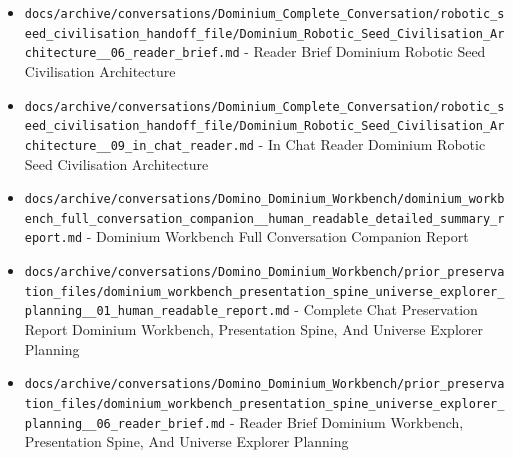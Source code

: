 \documentclass[10.5pt,a4paper,openany]{book}
\begin{document}
\begin{itemize}
\item \texttt{docs/\allowbreak{}archive/\allowbreak{}conversations/\allowbreak{}Dominium\_\allowbreak{}Complete\_\allowbreak{}Conversation/\allowbreak{}robotic\_\allowbreak{}seed\_\allowbreak{}civilisation\_\allowbreak{}handoff\_\allowbreak{}file/\allowbreak{}Dominium\_\allowbreak{}Robotic\_\allowbreak{}Seed\_\allowbreak{}Civilisation\_\allowbreak{}Architecture\_\allowbreak{}\_\allowbreak{}06\_\allowbreak{}reader\_\allowbreak{}brief.\allowbreak{}md} -\allowbreak{} Reader Brief Dominium Robotic Seed Civilisation Architecture
\item \texttt{docs/\allowbreak{}archive/\allowbreak{}conversations/\allowbreak{}Dominium\_\allowbreak{}Complete\_\allowbreak{}Conversation/\allowbreak{}robotic\_\allowbreak{}seed\_\allowbreak{}civilisation\_\allowbreak{}handoff\_\allowbreak{}file/\allowbreak{}Dominium\_\allowbreak{}Robotic\_\allowbreak{}Seed\_\allowbreak{}Civilisation\_\allowbreak{}Architecture\_\allowbreak{}\_\allowbreak{}09\_\allowbreak{}in\_\allowbreak{}chat\_\allowbreak{}reader.\allowbreak{}md} -\allowbreak{} In Chat Reader Dominium Robotic Seed Civilisation Architecture
\item \texttt{docs/\allowbreak{}archive/\allowbreak{}conversations/\allowbreak{}Domino\_\allowbreak{}Dominium\_\allowbreak{}Workbench/\allowbreak{}dominium\_\allowbreak{}workbench\_\allowbreak{}full\_\allowbreak{}conversation\_\allowbreak{}companion\_\allowbreak{}\_\allowbreak{}human\_\allowbreak{}readable\_\allowbreak{}detailed\_\allowbreak{}summary\_\allowbreak{}report.\allowbreak{}md} -\allowbreak{} Dominium Workbench Full Conversation Companion Report
\item \texttt{docs/\allowbreak{}archive/\allowbreak{}conversations/\allowbreak{}Domino\_\allowbreak{}Dominium\_\allowbreak{}Workbench/\allowbreak{}prior\_\allowbreak{}preservation\_\allowbreak{}files/\allowbreak{}dominium\_\allowbreak{}workbench\_\allowbreak{}presentation\_\allowbreak{}spine\_\allowbreak{}universe\_\allowbreak{}explorer\_\allowbreak{}planning\_\allowbreak{}\_\allowbreak{}01\_\allowbreak{}human\_\allowbreak{}readable\_\allowbreak{}report.\allowbreak{}md} -\allowbreak{} Complete Chat Preservation Report Dominium Workbench, Presentation Spine, And Universe Explorer Planning
\item \texttt{docs/\allowbreak{}archive/\allowbreak{}conversations/\allowbreak{}Domino\_\allowbreak{}Dominium\_\allowbreak{}Workbench/\allowbreak{}prior\_\allowbreak{}preservation\_\allowbreak{}files/\allowbreak{}dominium\_\allowbreak{}workbench\_\allowbreak{}presentation\_\allowbreak{}spine\_\allowbreak{}universe\_\allowbreak{}explorer\_\allowbreak{}planning\_\allowbreak{}\_\allowbreak{}06\_\allowbreak{}reader\_\allowbreak{}brief.\allowbreak{}md} -\allowbreak{} Reader Brief Dominium Workbench, Presentation Spine, And Universe Explorer Planning

\end{itemize}
\end{document}

